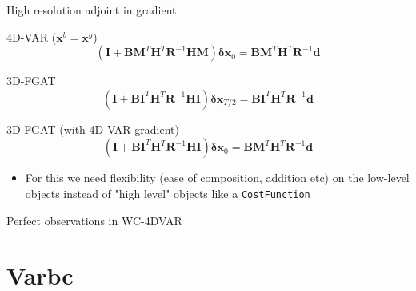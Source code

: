 \documentclass[9pt]{beamer}
\newcommand{\op}[1]{\mathrm{\mathbf{#1}}}
\renewcommand{\vec}[1]{\mathrm{\mathbf{#1}}}
\begin{document}
\begin{frame}{High resolution adjoint in gradient}


  4D-VAR ($\vec{x}^b=\vec{x}^g$)
$$ (\op{I} +  \op{B} \op{M}^{T} \op{H}^T \op{R}^{-1} \op{H} \op{M}) \vec{\delta x}_0 =  \op{B} \op{M}^{T} \op{H}^T \op{R}^{-1} \vec{d}$$

3D-FGAT
$$ (\op{I} +  \op{B} \op{I}^T \op{H}^T \op{R}^{-1} \op{H} \op{I}) \vec{\delta x}_{T/2} =  \op{B} \op{I}^{T} \op{H}^T \op{R}^{-1} \vec{d}$$

3D-FGAT (with 4D-VAR gradient)
$$ (\op{I} +  \op{B} \op{I}^T \op{H}^T \op{R}^{-1} \op{H} \op{I}) \vec{\delta x}_0 =  \op{B} \op{M}^{T} \op{H}^T \op{R}^{-1} \vec{d}$$

\begin{itemize} 
  \item For this we need flexibility (ease of composition, addition etc) on the low-level objects instead of "high level" objects like a \lstinline|CostFunction|  
\end{itemize} 


\end{frame}

\begin{frame}{Perfect observations in WC-4DVAR} 


\end{frame} 


\section{Varbc}
\end{document}
